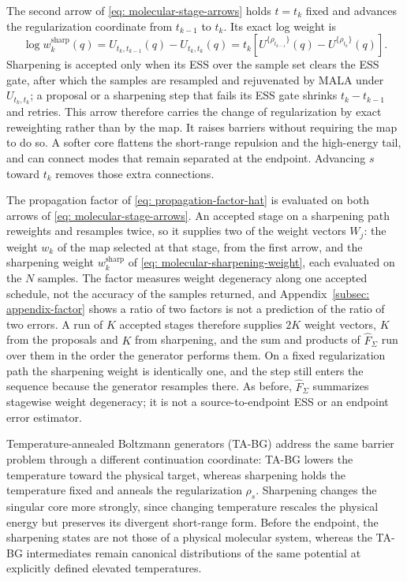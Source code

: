 \documentclass{article}
\begin{document}
The second arrow of \eqref{eq: molecular-stage-arrows} holds $t=t_k$ fixed and advances the regularization coordinate from $t_{k-1}$ to $t_k$. Its exact log weight is
\begin{equation}
\log w_k^{\mathrm{sharp}}(q)
=U_{t_k,t_{k-1}}(q)-U_{t_k,t_k}(q)
=t_k\!\left[U^{\{\rho_{t_{k-1}}\}}(q)
-U^{\{\rho_{t_k}\}}(q)\right].
\label{eq: molecular-sharpening-weight}
\end{equation}
Sharpening is accepted only when its ESS over the sample set clears the ESS gate, after which the samples are resampled and rejuvenated by MALA under $U_{t_k,t_k}$; a proposal or a sharpening step that fails its ESS gate shrinks $t_k-t_{k-1}$ and retries. This arrow therefore carries the change of regularization by exact reweighting rather than by the map. It raises barriers without requiring the map to do so. A softer core flattens the short-range repulsion and the high-energy tail, and can connect modes that remain separated at the endpoint. Advancing $s$ toward $t_k$ removes those extra connections.

The propagation factor of \eqref{eq: propagation-factor-hat} is evaluated on both arrows of \eqref{eq: molecular-stage-arrows}. An accepted stage on a sharpening path reweights and resamples twice, so it supplies two of the weight vectors $W_j$: the weight $w_k$ of the map selected at that stage, from the first arrow, and the sharpening weight $w_k^{\mathrm{sharp}}$ of \eqref{eq: molecular-sharpening-weight}, each evaluated on the $N$ samples. {\color{blue}The factor measures weight degeneracy along one accepted schedule, not the accuracy of the samples returned, and Appendix~\ref{subsec: appendix-factor} shows a ratio of two factors is not a prediction of the ratio of two errors.} A run of $K$ accepted stages therefore supplies $2K$ weight vectors, $K$ from the proposals and $K$ from sharpening, and the sum and products of $\hat F_\Sigma$ run over them in the order the generator performs them. On a fixed regularization path the sharpening weight is identically one, and the step still enters the sequence because the generator resamples there. As before, $\hat F_\Sigma$ summarizes stagewise weight degeneracy; it is not a source-to-endpoint ESS or an endpoint error estimator.

Temperature-annealed Boltzmann generators (TA-BG) \citep{schopmans2025temperature} address the same barrier problem through a different continuation coordinate: TA-BG lowers the temperature toward the physical target, whereas sharpening holds the temperature fixed and anneals the regularization $\rho_s$. Sharpening changes the singular core more strongly, since changing temperature rescales the physical energy but preserves its divergent short-range form. Before the endpoint, the sharpening states are not those of a physical molecular system, whereas the TA-BG intermediates remain canonical distributions of the same potential at explicitly defined elevated temperatures.
\end{document}
